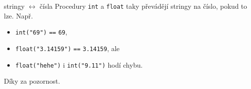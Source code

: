 \documentclass[aspectratio=169,11pt]{beamer}
\begin{document}
\begin{frame}{stringy $\leftrightarrow$ čísla}
 Procedury \texttt{int} a \texttt{float} taky převádějí stringy na číslo, pokud
 to lze. Např.
 \begin{itemize}
  \item<1-> \texttt{int("69")} \texttt{==} \texttt{69},
  \item<2-> \texttt{float("3.14159")} \texttt{==} \texttt{3.14159}, ale
  \item<3-> \texttt{float("hehe")} i \texttt{int("9.11")} hodí chybu.
 \end{itemize}
\end{frame}

\begin{frame}[plain]
 \centering\Huge Díky za pozornost.
\end{frame}
\end{document}
